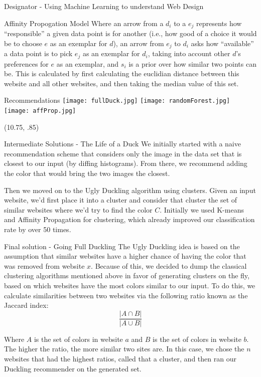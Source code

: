 \documentclass{beamer}
\begin{document}
\begin{frame}{\centerline{\Huge Designator - Using Machine Learning to understand Web Design}}
\begin{textblock}{5}
\begin{block}{Affinity Propogation Model}
Where an arrow from a $d_i$ to a $e_j$ represents how ``responsible'' a given data point is for another (i.e., how good of a choice it would be to choose $e$ as an exemplar for $d$), an arrow from $e_j$ to $d_i$ asks how ``available'' a data point is to pick $e_j$ as an exemplar for $d_i$, taking into account other $d$'s preferences for $e$ as an exemplar, and $s_i$ is a prior over how similar two points can be. This is calculated by first calculating the euclidian distance between this website and all other websites, and then taking the median value of this set.
\end{block}
\begin{block}{Recommendations}
\texttt{[image: fullDuck.jpg]}
\texttt{[image: randomForest.jpg]}
\texttt{[image: affProp.jpg]}


\end{block}
\end{textblock}

\begin{textblock}{5}(10.75, .85)
\begin{block}{Intermediate Solutions - The Life of a Duck}
We initially started with a naive recommendation scheme that considers only the image in the data set that is closest to our input (by diffing
histograms). From there, we recommend adding the color that would bring the two images the
closest.

Then we moved on to the Ugly Duckling algorithm using clusters. Given an input website, we'd first place it into a
cluster and consider that cluster the set of similar websites where we'd try to find the color $C$. Initially we used K-means and
Affinity Propagation for clustering, which already improved our classification rate by over 50 times.
\end{block}

\begin{block}{Final solution - Going Full Duckling}
The Ugly Duckling idea is based on the assumption that similar websites have a higher chance of having the color that
was removed from website $x$. Because of this, we decided to dump the classical clustering algorithms mentioned above in favor of
generating clusters on the fly, based on which websites have the most colors similar to our input. To do this, we
calculate similarities between two websites via the following ratio known as the Jaccard index:
$$\frac{|A \cap B|}{|A \cup B|}$$

Where $A$ is the set of colors in website $a$ and $B$ is the set of colors in website $b$. The higher the ratio, the
more similar two sites are. In this case, we chose the $n$ websites that had the highest ratios, called that a cluster,
and then ran our Duckling recommender on the generated set.


\end{block}
\end{textblock}
\end{frame}
\end{document}
